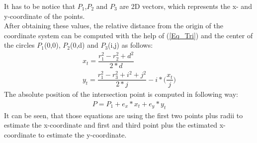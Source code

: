 It has to be notice that $P_1$,$P_2$  and $P_3$ are 2D vectors, which represents the x- and y-coordinate of the points.\\ 
After obtaining these values, the relative distance from the origin of the coordinate system can be computed with the help of (\ref{Eq_Tri}) and the center of the circles $P_1$(0,0), $P_2$(0,d) and $P_3$(i,j) as follows:
\begin{align}
x_t = \dfrac{r_1^2 - r_2^2 + d^2}{2*d} \\
y_t = \dfrac{r_1^2 - r_3^2 + i^2 + j^2}{2*j} - i* \bigg(\dfrac{x_t}{j}\bigg) 
\end{align}
The absolute position of the intersection point is computed in following way:
\begin{align}
P = P_1 + e_x * x_t + e_y * y_t 
\end{align}
It can be seen, that those equations are using the first two points plus radii to estimate the x-coordinate and first and third point plus the estimated x-coordinate to estimate the y-coordinate.\\ 
